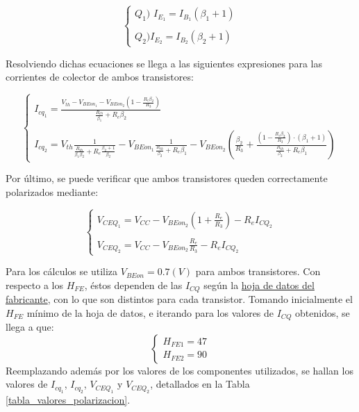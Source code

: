 	\begin{equation}
		\begin{cases}
		Q_{1}) \, \, I_{E_{1}} = I_{B_{1}}(\beta_{1}+1)\\ \\
		Q_{2}) I_{E_{2}}=I_{B_{2}}(\beta_{2}+1)
		\end{cases}
	\end{equation}

Resolviendo dichas ecuaciones se llega a las siguientes expresiones para las corrientes de colector de ambos transistores:

	\begin{equation}
		\begin{cases}
		I_{cq_{1}}=\frac{V_{th}-V_{BEon_{1}}-V_{BEon_{2}}\left(1-\frac{R_{e}\beta_{2}}{R_{3}}\right)}{\frac{R_{th}}{\beta_{1}}+R_{e}\beta_{2}}\\ \\
		I_{cq_{2}}=V_{th}\frac{1}{\frac{R_{th}}{\beta_{1}\beta_{2}}+R_{e}\frac{\beta_{2}+1}{\beta_{2}}}-V_{BEon_{1}}\frac{1}{\frac{R_{th}}{\beta_{2}}+R_{e}\beta_{1}}-V_{BEon_{2}}\left(\frac{\beta_{2}}{R_{3}}+\frac{\left(1-\frac{R_{e}\beta_{2}}{R_{3}}\right)\cdot(\beta_{1}+1)}{\frac{R_{th}}{\beta_{2}}+R_{e}\beta_{1}} \right)
		\end{cases}
	\end{equation}

Por último, se puede verificar que ambos transistores queden correctamente polarizados mediante:

	\begin{equation}
		\begin{cases}
		V_{CEQ_{1}}=V_{CC}-V_{BEon_{2}}\left(1+\frac{R_{e}}{R_{3}}\right)-R_{e}I_{CQ_{2}}\\ \\
		V_{CEQ_{2}}=V_{CC}-V_{BEon_{2}}\frac{R_{e}}{R_{3}}-R_{e}I_{CQ_{2}}
		\end{cases}
	\end{equation}
	

Para los cálculos se utiliza $V_{BEon}=0.7(V)$ para ambos transistores. Con respecto a los $H_{FE}$, éstos dependen de las $I_{CQ}$ según la \href{https://pdf1.alldatasheet.com/datasheet-pdf/view/171970/ONSEMI/BC337-40.html}{hoja de datos del fabricante}, con lo que son distintos para cada transistor. Tomando inicialmente el $H_{FE}$ mínimo de la hoja de datos, e iterando para los valores de $I_{CQ}$ obtenidos, se llega a que:
	\begin{equation*}
		\begin{cases}
		 H_{FE1} = 47\\
		 H_{FE2} = 90
		\end{cases}
	\end{equation*}
Reemplazando además por los valores de los componentes utilizados, se hallan los valores de $I_{cq_{1}}$, $I_{cq_{2}}$, $V_{CEQ_{1}}$ y $V_{CEQ_{2}}$, detallados en la Tabla \ref{tabla_valores_polarizacion}.


